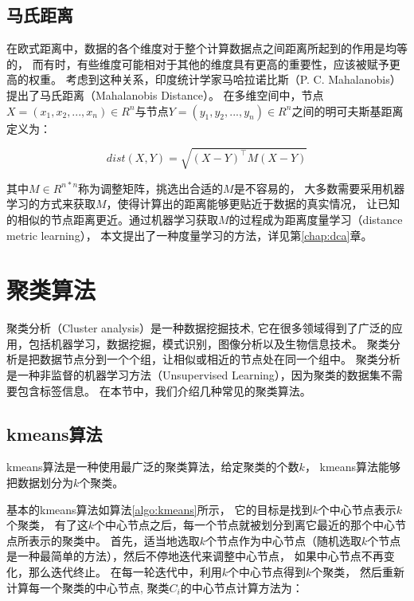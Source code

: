 \subsection{马氏距离}

在欧式距离中，数据的各个维度对于整个计算数据点之间距离所起到的作用是均等的，
而有时，有些维度可能相对于其他的维度具有更高的重要性，应该被赋予更高的权重。
考虑到这种关系，印度统计学家马哈拉诺比斯（P. C. Mahalanobis）提出了马氏距离（Mahalanobis Distance）。
在多维空间中，节点$X = (x_1, x_2, ..., x_n) \in R ^ n$与节点$Y = (y_1, y_2, ..., y_n) \in R ^ n$之间的明可夫斯基距离定义为：

\begin{equation}
    dist(X, Y) = \sqrt{(X - Y)^\top M (X - Y)}
\end{equation}

其中$M \in R ^{n * n}$称为调整矩阵，挑选出合适的$M$是不容易的，
大多数需要采用机器学习的方式来获取$M$，使得计算出的距离能够更贴近于数据的真实情况，
让已知的相似的节点距离更近。通过机器学习获取$M$的过程成为距离度量学习（distance metric learning），
本文提出了一种度量学习的方法，详见第\ref{chap:dca}章。

\section{聚类算法}
\label{sec:cluster}

聚类分析（Cluster analysis）是一种数据挖掘技术,
它在很多领域得到了广泛的应用，包括机器学习，数据挖掘，模式识别，图像分析以及生物信息技术。
聚类分析是把数据节点分到一个个组，让相似或相近的节点处在同一个组中。
聚类分析是一种非监督的机器学习方法（Unsupervised Learning），因为聚类的数据集不需要包含标签信息。
在本节中，我们介绍几种常见的聚类算法。

\subsection{kmeans算法}

kmeans算法是一种使用最广泛的聚类算法，给定聚类的个数$k$，
kmeans算法能够把数据划分为$k$个聚类。

基本的kmeans算法如算法\ref{algo:kmeans}所示，
它的目标是找到$k$个中心节点表示$k$个聚类，
有了这$k$个中心节点之后，每一个节点就被划分到离它最近的那个中心节点所表示的聚类中。
首先，适当地选取$k$个节点作为中心节点（随机选取$k$个节点是一种最简单的方法），然后不停地迭代来调整中心节点，
如果中心节点不再变化，那么迭代终止。
在每一轮迭代中，利用$k$个中心节点得到$k$个聚类，
然后重新计算每一个聚类的中心节点, 聚类$C_i$的中心节点计算方法为：


